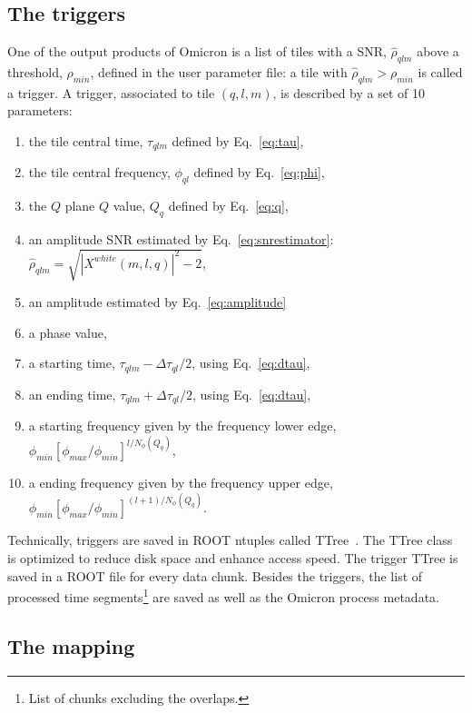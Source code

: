 \subsection{The triggers} \label{sec:algorithm:triggering}
One of the output products of Omicron is a list of tiles with a SNR, $\hat{\rho}_{qlm}$ above a threshold, $\rho_{min}$, defined in the user parameter file: a tile with $\hat{\rho}_{qlm} > \rho_{min}$ is called a trigger. A trigger, associated to tile $(q,l,m)$, is described by a set of 10 parameters:
\begin{enumerate}
  \item the tile central time, $\tau_{qlm}$ defined by Eq.~\ref{eq:tau},
  \item the tile central frequency, $\phi_{ql}$ defined by Eq.~\ref{eq:phi},
  \item the $Q$ plane $Q$ value, $Q_{q}$ defined by Eq.~\ref{eq:q},
  \item an amplitude SNR estimated by Eq.~\ref{eq:snrestimator}: $\hat{\rho}_{qlm} = \sqrt{ |X^{white}(m,l,q)|^2-2}$,
  \item an amplitude estimated by Eq.~\ref{eq:amplitude}
  \item a phase value, 
  \item a starting time, $\tau_{qlm} - \Delta \tau_{ql}/2$, using Eq.~\ref{eq:dtau},
  \item an ending time, $\tau_{qlm} +\Delta \tau_{ql}/2$, using Eq.~\ref{eq:dtau},
  \item a starting frequency given by the frequency lower edge, $\phi_{min}[\phi_{max}/\phi_{min}]^{l/N_{\phi}(Q_q)}$,
  \item a ending frequency given by the frequency upper edge, $\phi_{min}[\phi_{max}/\phi_{min}]^{(l+1)/N_{\phi}(Q_q)}$.
\end{enumerate}
Technically, triggers are saved in ROOT ntuples called TTree~\cite{Brun:1997pa}. The TTree class is optimized to reduce disk space and enhance access speed. The trigger TTree is saved in a ROOT file for every data chunk. Besides the triggers, the list of processed time segments\footnote{List of chunks excluding the overlaps.} are saved as well as the Omicron process metadata.


\subsection{The mapping} \label{sec:algorithm:mapping}

